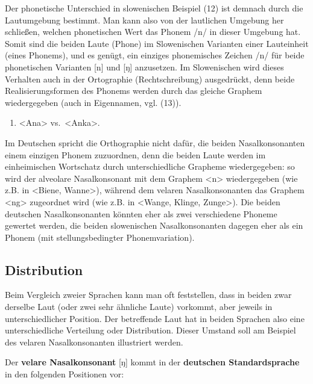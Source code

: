 \documentclass[
  letterpaper,
]{scrbook}
\providecommand{\tightlist}{%
  \setlength{\itemsep}{0pt}\setlength{\parskip}{0pt}}\usepackage{longtable,booktabs,array}
\begin{document}
Der phonetische Unterschied in slowenischen Beispiel (12) ist demnach
durch die Lautumgebung bestimmt. Man kann also von der lautlichen
Umgebung her schließen, welchen phonetischen Wert das Phonem /n/ in
dieser Umgebung hat. Somit sind die beiden Laute (Phone) im Slowenischen
Varianten einer Lauteinheit (eines Phonems), und es genügt, ein einziges
phonemisches Zeichen /n/ für beide phonetischen Varianten {[}n{]} und
{[}ŋ{]} anzusetzen. Im Slowenischen wird dieses Verhalten auch in der
Ortographie (Rechtschreibung) ausgedrückt, denn beide
Realisierungsformen des Phonems werden durch das gleiche Graphem
wiedergegeben (auch in Eigennamen, vgl. (13)).

\begin{enumerate}
\def\labelenumi{(\arabic{enumi})}
\setcounter{enumi}{12}
\tightlist
\item
  \textless Ana\textgreater{} vs.~\textless Anka\textgreater.
\end{enumerate}

Im Deutschen spricht die Orthographie nicht dafür, die beiden
Nasalkonsonanten einem einzigen Phonem zuzuordnen, denn die beiden Laute
werden im einheimischen Wortschatz durch unterschiedliche Grapheme
wiedergegeben: so wird der alveolare Nasalkonsonant mit dem Graphem
\textless n\textgreater{} wiedergegeben (wie z.B. in \textless Biene,
Wanne\textgreater), während dem velaren Nasalkonsonanten das Graphem
\textless ng\textgreater{} zugeordnet wird (wie z.B. in \textless Wange,
Klinge, Zunge\textgreater). Die beiden deutschen Nasalkonsonanten
könnten eher als zwei verschiedene Phoneme gewertet werden, die beiden
slowenischen Nasalkonsonanten dagegen eher als ein Phonem (mit
stellungsbedingter Phonemvariation).

\hypertarget{distribution}{%
\subsection{Distribution}\label{distribution}}

Beim Vergleich zweier Sprachen kann man oft feststellen, dass in beiden
zwar derselbe Laut (oder zwei sehr ähnliche Laute) vorkommt, aber
jeweils in unterschiedlicher Position. Der betreffende Laut hat in
beiden Sprachen also eine unterschiedliche Verteilung oder Distribution.
Dieser Umstand soll am Beispiel des velaren Nasalkonsonanten illustriert
werden.

Der \textbf{velare Nasalkonsonant} {[}ŋ{]} kommt in der
\textbf{deutschen Standardsprache} in den folgenden Positionen vor:
\end{document}
